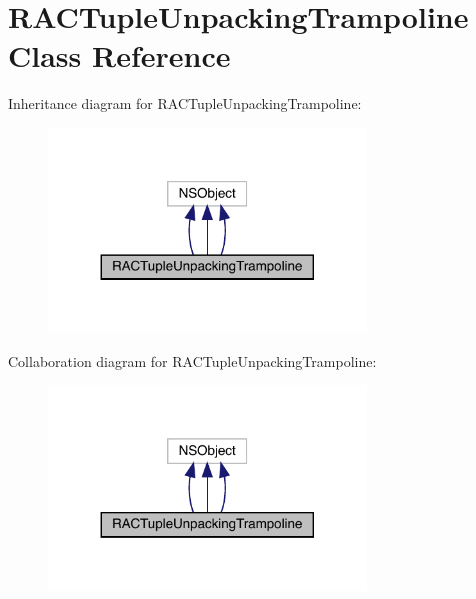 \hypertarget{interface_r_a_c_tuple_unpacking_trampoline}{}\section{R\+A\+C\+Tuple\+Unpacking\+Trampoline Class Reference}
\label{interface_r_a_c_tuple_unpacking_trampoline}


Inheritance diagram for R\+A\+C\+Tuple\+Unpacking\+Trampoline\+:\nopagebreak
\begin{figure}[H]
\begin{center}
\leavevmode
\includegraphics[width=239pt]{interface_r_a_c_tuple_unpacking_trampoline__inherit__graph}
\end{center}
\end{figure}


Collaboration diagram for R\+A\+C\+Tuple\+Unpacking\+Trampoline\+:\nopagebreak
\begin{figure}[H]
\begin{center}
\leavevmode
\includegraphics[width=239pt]{interface_r_a_c_tuple_unpacking_trampoline__coll__graph}
\end{center}
\end{figure}
